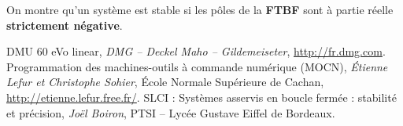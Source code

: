\documentclass[10pt,fleqn]{article} %
\begin{document}
\begin{resultat}
On montre qu'un système est stable si les pôles de la \textbf{FTBF} sont à partie réelle \textbf{strictement négative}.
\end{resultat}

\begin{thebibliography}{2}
    DMU 60 eVo linear, \textit{DMG -- Deckel Maho -- Gildemeiseter}, \url{http://fr.dmg.com}.
    Programmation des machines-outils à commande numérique (MOCN), \textit{Étienne Lefur et Christophe Sohier}, École Normale Supérieure de Cachan, \url{http://etienne.lefur.free.fr/}.
    SLCI : Systèmes asservis en boucle fermée : stabilité et précision, \textit{Joël Boiron}, PTSI -- Lycée Gustave Eiffel de Bordeaux.

\end{thebibliography}
\end{document}
